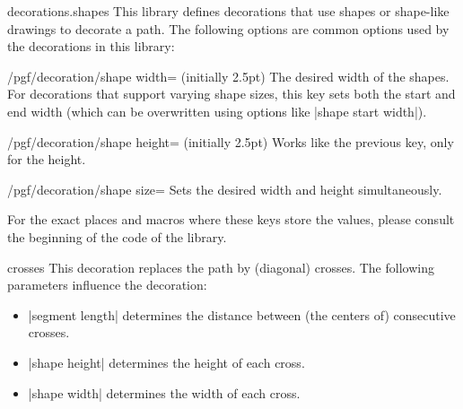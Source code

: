 \begin{pgflibrary}{decorations.shapes}
    This library defines decorations that use shapes or shape-like drawings to
    decorate a path. The following options are common options used by the
    decorations in this library:

    \begin{key}{/pgf/decoration/shape width=  (initially 2.5pt)}
        The desired width of the shapes. For decorations that support varying
        shape sizes, this key sets both the start and end width (which can be
        overwritten using options like |shape start width|).
    \end{key}

    \begin{key}{/pgf/decoration/shape height= (initially 2.5pt)}
        Works like the previous key, only for the height.
    \end{key}

    \begin{key}{/pgf/decoration/shape size=}
        Sets the desired width and height simultaneously.
    \end{key}

    For the exact places and macros where these keys store the values, please
    consult the beginning of the code of the library.
\end{pgflibrary}

\begin{decoration}{crosses}
    This decoration replaces the path by (diagonal) crosses. The following
    parameters influence the decoration:
    \begin{itemize}
        \item |segment length| determines the distance between (the centers of)
            consecutive crosses.
        \item |shape height| determines the height of each cross.
        \item |shape width| determines the width of each cross.
    \end{itemize}
\begin{codeexample}[preamble={\usetikzlibrary{decorations.shapes}}]
\end{codeexample}
\end{decoration}

